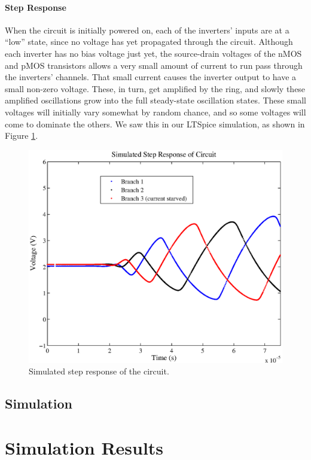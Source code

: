\documentclass{article}
\begin{document}
\paragraph{Step Response}

When the circuit is initially powered on, each of the inverters' inputs are at a ``low'' state, since no voltage has yet propagated through the circuit.  Although each inverter has no bias voltage just yet, the source-drain voltages of the nMOS and pMOS transistors allows a very small amount of current to run pass through the inverters' channels. That small current causes the inverter output to have a small non-zero voltage. These, in turn, get amplified by the ring, and slowly these amplified oscillations grow into the full steady-state oscillation states.  These small voltages will initially vary somewhat by random chance, and so some voltages will come to dominate the others.  We saw this in our LTSpice simulation, as shown in Figure \ref{step}.

\begin{figure}[H]	
\centering			
\includegraphics[scale=.5]{step.eps}
\caption{Simulated step response of the circuit.}
\label{step}		
\end{figure} 	

\subsection*{Simulation}

\section*{Simulation Results}
\end{document}

